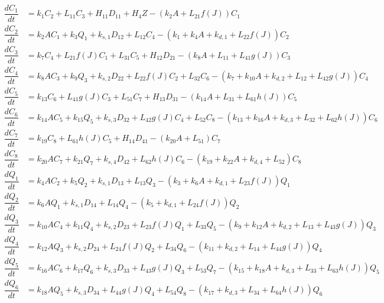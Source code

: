 \begin{align*}
\dfrac{dC_{1}}{dt} & =k_{1}C_{2}+L_{11}C_{3}+H_{11}D_{11}+H_{4}Z-\left(k_{2}A+L_{21}f\left(J\right)\right)C_{1}\\
\dfrac{dC_{2}}{dt} & =k_{2}AC_{1}+k_{3}Q_{1}+k_{s,1}D_{12}+L_{12}C_{4}-\left(k_{1}+k_{4}A+k_{d,1}+L_{22}f\left(J\right)\right)C_{2}\\
\dfrac{dC_{3}}{dt} & =k_{7}C_{4}+L_{21}f\left(J\right)C_{1}+L_{31}C_{5}+H_{12}D_{21}-\left(k_{8}A+L_{11}+L_{41}g\left(J\right)\right)C_{3}\\
\dfrac{dC_{4}}{dt} & =k_{8}AC_{3}+k_{9}Q_{3}+k_{s,2}D_{22}+L_{22}f\left(J\right)C_{2}+L_{32}C_{6}-\left(k_{7}+k_{10}A+k_{d,2}+L_{12}+L_{42}g\left(J\right)\right)C_{4}\\
\dfrac{dC_{5}}{dt} & =k_{13}C_{6}+L_{41}g\left(J\right)C_{3}+L_{51}C_{7}+H_{13}D_{31}-\left(k_{14}A+L_{31}+L_{61}h\left(J\right)\right)C_{5}\\
\dfrac{dC_{6}}{dt} & =k_{14}AC_{5}+k_{15}Q_{5}+k_{s,3}D_{32}+L_{42}g\left(J\right)C_{4}+L_{52}C_{8}-\left(k_{13}+k_{16}A+k_{d,3}+L_{32}+L_{62}h\left(J\right)\right)C_{6}\\
\dfrac{dC_{7}}{dt} & =k_{19}C_{8}+L_{61}h\left(J\right)C_{5}+H_{14}D_{41}-\left(k_{20}A+L_{51}\right)C_{7}\\
\dfrac{dC_{8}}{dt} & =k_{20}AC_{7}+k_{21}Q_{7}+k_{s,4}D_{42}+L_{62}h\left(J\right)C_{6}-\left(k_{19}+k_{22}A+k_{d,4}+L_{52}\right)C_{8}\\
\dfrac{dQ_{1}}{dt} & =k_{4}AC_{2}+k_{5}Q_{2}+k_{s,1}D_{13}+L_{13}Q_{3}-\left(k_{3}+k_{6}A+k_{d,1}+L_{23}f\left(J\right)\right)Q_{1}\\
\dfrac{dQ_{2}}{dt} & =k_{6}AQ_{1}+k_{s,1}D_{14}+L_{14}Q_{4}-\left(k_{5}+k_{d,1}+L_{24}f\left(J\right)\right)Q_{2}\\
\dfrac{dQ_{3}}{dt} & =k_{10}AC_{4}+k_{11}Q_{4}+k_{s,2}D_{23}+L_{23}f\left(J\right)Q_{1}+L_{33}Q_{5}-\left(k_{9}+k_{12}A+k_{d,2}+L_{13}+L_{43}g\left(J\right)\right)Q_{3}\\
\dfrac{dQ_{4}}{dt} & =k_{12}AQ_{3}+k_{s,2}D_{24}+L_{24}f\left(J\right)Q_{2}+L_{34}Q_{6}-\left(k_{11}+k_{d,2}+L_{14}+L_{44}g\left(J\right)\right)Q_{4}\\
\dfrac{dQ_{5}}{dt} & =k_{16}AC_{6}+k_{17}Q_{6}+k_{s,3}D_{33}+L_{43}g\left(J\right)Q_{3}+L_{53}Q_{7}-\left(k_{15}+k_{18}A+k_{d,3}+L_{33}+L_{63}h\left(J\right)\right)Q_{5}\\
\dfrac{dQ_{6}}{dt} & =k_{18}AQ_{5}+k_{s,3}D_{34}+L_{44}g\left(J\right)Q_{4}+L_{54}Q_{8}-\left(k_{17}+k_{d,3}+L_{34}+L_{64}h\left(J\right)\right)Q_{6}\\

\end{align*}
